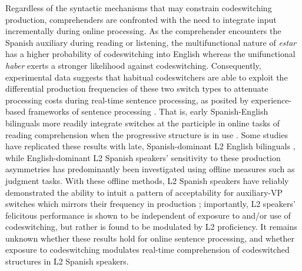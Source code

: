 \documentclass[output=paper,colorlinks,citecolor=brown]{langscibook}
\begin{document}
Regardless of the syntactic mechanisms that may constrain codeswitching production, comprehenders are confronted with the need to integrate input incrementally during online processing. As the comprehender encounters the Spanish auxiliary during reading or listening, the multifunctional nature of \textit{estar} has a higher probability of codeswitching into English whereas the unifunctional \textit{haber} exerts a stronger likelihood against codeswitching. Consequently, experimental data suggests that habitual codeswitchers are able to exploit the differential production frequencies of these two switch types to attenuate processing costs during real-time sentence processing, as posited by experience-based frameworks of sentence processing \citep{DellChang2014,MacDonald2013}. That is, early Spanish-English bilinguals more readily integrate switches at the participle in online tasks of reading comprehension when the progressive structure is in use \citep{Dussias2003,GuzzardoTamargoetal2016,ValdesKroffetal2018}. Some studies have replicated these results with late, Spanish-dominant L2 English bilinguals \citep{Guzzardo2013,GuzzardoTamargoetal2016}, while English-dominant L2 Spanish speakers’ sensitivity to these production asymmetries has predominantly been investigated using offline measures such as judgment tasks. With these offline methods, L2 Spanish speakers have reliably demonstrated the ability to intuit a pattern of acceptability for auxiliary-VP switches which mirrors their frequency in production \citep{Giancaspro2015,Koronkiewicz2018,Toribio2001}; importantly, L2 speakers’ felicitous performance is shown to be independent of exposure to and/or use of codeswitching, but rather is found to be modulated by L2 proficiency. It remains unknown whether these results hold for online sentence processing, and whether exposure to codeswitching modulates real-time comprehension of codeswitched structures in L2 Spanish speakers.
\end{document}
